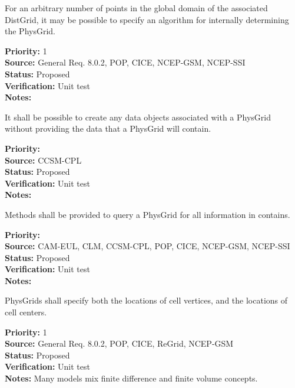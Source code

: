 For an arbitrary number of points in the global domain of the associated
DistGrid, it may be possible to specify an algorithm for internally
determining the PhysGrid.
\begin{reqlist}
{\bf Priority:} 1 \\
{\bf Source:} General Req. 8.0.2, POP, CICE, NCEP-GSM, NCEP-SSI \\
{\bf Status:} Proposed \\
{\bf Verification:} Unit test\\
{\bf Notes:} 
\end{reqlist}

It shall be possible to create any data objects associated with a PhysGrid without
providing the data that a PhysGrid will contain.
\begin{reqlist}
{\bf Priority:} \\
{\bf Source:} CCSM-CPL \\
{\bf Status:} Proposed \\
{\bf Verification:} Unit test\\
{\bf Notes:} 
\end{reqlist}

Methods shall be provided to query a PhysGrid for all information in contains.
\begin{reqlist}
{\bf Priority:} \\
{\bf Source:} CAM-EUL, CLM, CCSM-CPL, POP, CICE, NCEP-GSM, NCEP-SSI \\
{\bf Status:} Proposed \\
{\bf Verification:} Unit test\\
{\bf Notes:} 
\end{reqlist}

PhysGrids shall specify both the locations of cell vertices, and the locations
of cell centers.
\begin{reqlist}
{\bf Priority:} 1 \\
{\bf Source:} General Req. 8.0.2, POP, CICE, ReGrid, NCEP-GSM \\
{\bf Status:} Proposed \\
{\bf Verification:} Unit test\\
{\bf Notes:} Many models mix finite difference and finite volume concepts.
\end{reqlist}

